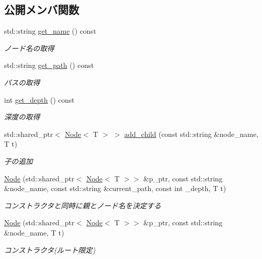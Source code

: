 \subsection*{公開メンバ関数}
\begin{DoxyCompactItemize}
\item 
std\+::string \mbox{\hyperlink{classsaki_1_1_node_ab0daef362cc404496f170b3ef0a355f0}{get\+\_\+name}} () const
\begin{DoxyCompactList}\small\item\em ノード名の取得 \end{DoxyCompactList}\item 
std\+::string \mbox{\hyperlink{classsaki_1_1_node_a5aa0d398aa417048879bc71d51ce2aa3}{get\+\_\+path}} () const
\begin{DoxyCompactList}\small\item\em パスの取得 \end{DoxyCompactList}\item 
int \mbox{\hyperlink{classsaki_1_1_node_a8351b7ef227bc1f97f4d82748d6aa2a3}{get\+\_\+depth}} () const
\begin{DoxyCompactList}\small\item\em 深度の取得 \end{DoxyCompactList}\item 
std\+::shared\+\_\+ptr$<$ \mbox{\hyperlink{classsaki_1_1_node}{Node}}$<$ T $>$ $>$ \mbox{\hyperlink{classsaki_1_1_node_acc2ba97cc286656b167548214c459243}{add\+\_\+child}} (const std\+::string \&node\+\_\+name, T t)
\begin{DoxyCompactList}\small\item\em 子の追加 \end{DoxyCompactList}\item 
\mbox{\hyperlink{classsaki_1_1_node_a181585031c9062f15fba568b709a8cde}{Node}} (std\+::shared\+\_\+ptr$<$ \mbox{\hyperlink{classsaki_1_1_node}{Node}}$<$ T $>$$>$ \&p\+\_\+ptr, const std\+::string \&node\+\_\+name, const std\+::string \&current\+\_\+path, const int \+\_\+depth, T t)
\begin{DoxyCompactList}\small\item\em コンストラクタと同時に親とノード名を決定する \end{DoxyCompactList}\item 
\mbox{\hyperlink{classsaki_1_1_node_a100d4e1cfc9f04e51f405ee1d41d654b}{Node}} (std\+::shared\+\_\+ptr$<$ \mbox{\hyperlink{classsaki_1_1_node}{Node}}$<$ T $>$$>$ \&p\+\_\+ptr, const std\+::string \&node\+\_\+name, T t)
\begin{DoxyCompactList}\small\item\em コンストラクタ(ルート限定) \end{DoxyCompactList}\item 

\end{DoxyCompactItemize}

